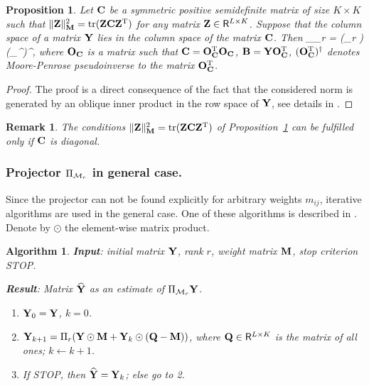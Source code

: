 \documentclass[sii]{ipart}
\DeclareMathOperator{\tr}{tr}
\newtheorem{proposition}{Proposition}
\newtheorem{algorithm}{Algorithm}
\newtheorem{remark}{Remark}
\begin{document}
\begin{proposition}
	\label{prop:projS}
	Let $\mathbf{C}$ be a symmetric positive semidefinite matrix of size $K \times K$ such that $\|\bfZ\|_\bfM^2 = \tr(\bfZ \bfC \bfZ^\rmT)$ for any matrix $\mathbf{Z}\in \mathsf{R}^{L\times K}$.
	Suppose that the column space of a matrix $\mathbf{Y}$ lies in the column space of the matrix $\mathbf{C}$.
	Then
	\be
	\label{eq:PiMr}
	\Pi_{\calM_r} \bfY = (\Pi_r \bfB) (\bfO_\bfC^{\rmT})^\dagger,
	\ee
	where $\mathbf{O}_{\mathbf{C}}$ is a matrix such that $\mathbf{C} = \mathbf{O}_{\mathbf{C}}^{\mathrm{T}}\mathbf{O}_{\mathbf{C}}$,
	$\mathbf{B} = \mathbf{Y} \mathbf{O}_{\mathbf{C}}^{\mathrm{T}}$, $(\mathbf{O}_{\mathbf{C}}^{\mathrm{T}})^\dagger$ denotes  Moore-Penrose pseudoinverse to the matrix $\mathbf{O}_{\mathbf{C}}^{\mathrm{T}}$.
\end{proposition}
\begin{proof}
	The proof is a direct consequence of the fact that the considered norm is generated by an oblique inner product in the row space of $\mathbf{Y}$, see details in \cite{Golyandina2013}.
\end{proof}

\begin{remark}
\label{rem:diagC}
	The conditions $\|\bfZ\|_\bfM^2 = \tr(\bfZ \bfC \bfZ^\rmT)$ of Proposition~\ref{prop:projS} can be fulfilled only if $\mathbf{C}$ is diagonal.
\end{remark}

\subsubsection{Projector $\Pi_{\mathcal{M}_r}$ in general case.}
Since the projector can not be found explicitly for arbitrary weights $m_{ij}$, iterative algorithms are used in the general case.
One of these algorithms is described in \cite{Srebro2003}. Denote by $\odot$ the element-wise matrix product.

\begin{algorithm}
	\label{alg:weightedSVD}
	\textbf{Input}: initial matrix $\mathbf{Y}$, rank $r$, weight matrix $\mathbf{M}$,
	stop criterion STOP.
	
	\textbf{Result}:
	Matrix $\widehat{\mathbf{Y}}$ as an estimate of $\Pi_{\mathcal{M}_r} \mathbf{Y}$.
	
	\begin{enumerate}
		\item
		$\mathbf{Y}_0 = \mathbf{Y}$, $k=0$.
		\item
		$\mathbf{Y}_{k+1} = \Pi_r(\mathbf{Y} \odot \mathbf{M} + \mathbf{Y}_{k} \odot (\mathbf{Q} -  \mathbf{M}))$, where
		$\mathbf{Q} \in \mathsf{R}^{L \times K}$ is the matrix of all ones; 
        \quad $k\leftarrow k+1$.
		\item
		If STOP, then $\widehat{\mathbf{Y}} = \mathbf{Y}_k$; else go to 2.
	\end{enumerate}
\end{algorithm}
\end{document}
